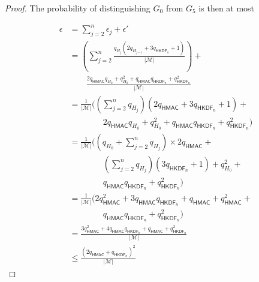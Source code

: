 \documentclass[compsoc, conference, letterpaper, 10pt, times]{IEEEtran}
\newif\ifapproxproba
\newcommand{\HKDF}{\mathsf{HKDF}}
\newcommand{\hmac}{\mathsf{HMAC}}
\newcommand{\Smac}{\mathcal{M}}
\begin{document}
\begin{proof}
The probability of distinguishing $G_0$ from $G_5$ is then
at most 
\ifapproxproba
\begin{align*}
\epsilon &= \sum_{j=2}^n \epsilon_j + \epsilon' \\
&= {\cal O}\left(\left(\sum_{j=2}^n \frac{q_{H_{j}}(q_{H_{j-1}} + 2q_{\HKDF_n})}{|\Smac|} \right) + \frac{(q_{\hmac} + q_{\HKDF_n})^2}{|\Smac|}\right)\\
&= {\cal O}\left(\left(\sum_{j=2}^n \frac{q_{H_{j}}(q_{\hmac} + 2q_{\HKDF_n})}{|\Smac|} \right) + \frac{(q_{\hmac} + q_{\HKDF_n})^2}{|\Smac|}\right)\\
&= {\cal O}\left(\left(\frac{(\sum_{j=2}^nq_{H_{j}})(q_{\hmac} + 2 q_{\HKDF_n})}{|\Smac|} \right) + \frac{(q_{\hmac} + q_{\HKDF_n})^2}{|\Smac|}\right)\\
&= {\cal O}\left(\left(\frac{q_{\hmac}(q_{\hmac} + 2 q_{\HKDF_n})}{|\Smac|} \right) + \frac{(q_{\hmac} + q_{\HKDF_n})^2}{|\Smac|}\right)\\
&= {\cal O}\left(\frac{(q_{\hmac} + q_{\HKDF_n})^2}{|\Smac|}\right)\\
\end{align*}
\else
\begin{align*}
\epsilon &= \sum_{j=2}^n \epsilon_j + \epsilon' \\
&= \left(\sum_{j=2}^n \frac{q_{H_{j}}(2q_{H_{j-1}} + 3q_{\HKDF_n}+1)}{|\Smac|} \right) + {}\\
&\qquad \frac{2q_{\hmac}q_{H_0} + q_{H_0}^2 + q_{\hmac}q_{\HKDF_n} + q_{\HKDF_n}^2}{|\Smac|}\\
&= \frac{1}{|\Smac|}((\sum_{j=2}^n q_{H_{j}})(2q_{\hmac} + 3q_{\HKDF_n}+1) + {}\\[-1mm]
&\qquad \qquad 2q_{\hmac}q_{H_0} + q_{H_0}^2 + q_{\hmac}q_{\HKDF_n} + q_{\HKDF_n}^2)\\
&= \frac{1}{|\Smac|}((q_{H_0} + \sum_{j=2}^n q_{H_{j}})\times 2q_{\hmac} + {}\\[-3mm]
&\qquad\qquad (\sum_{j=2}^n q_{H_{j}})(3q_{\HKDF_n}+1) + q_{H_0}^2 + {}\\[-2mm]
&\qquad\qquad q_{\hmac}q_{\HKDF_n} + q_{\HKDF_n}^2)\\
&= \frac{1}{|\Smac|}(2q_{\hmac}^2 + 3q_{\hmac}q_{\HKDF_n} + q_{\hmac} + q_{\hmac}^2 + {}\\[-3mm]
&\qquad\qquad q_{\hmac}q_{\HKDF_n} + q_{\HKDF_n}^2)\\
&= \frac{3q_{\hmac}^2 + 4q_{\hmac}q_{\HKDF_n} + q_{\hmac} + q_{\HKDF_n}^2}{|\Smac|}\\
&\leq \frac{(2q_{\hmac} + q_{\HKDF_n})^2}{|\Smac|} 
\end{align*}
\fi
\end{proof}
\end{document}
